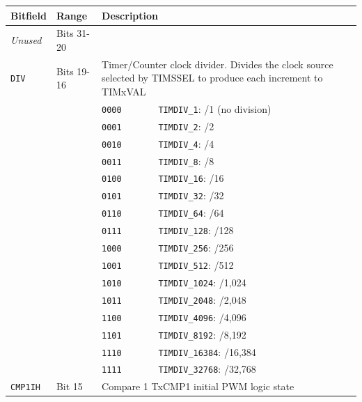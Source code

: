 \begin{tabularx}{\textwidth}{ l l l X }
\textbf{Bitfield} & \textbf{Range} & \multicolumn{2}{X}{\textbf{Description}} \\ \hline
\textit{Unused} & Bits 31-20 & \multicolumn{2}{X}{} \\
\hline
\texttt{DIV} & Bits 19-16 & \multicolumn{2}{X}{Timer/Counter clock divider. Divides the clock source selected by TIMSSEL to produce each increment to TIMxVAL} \\
 & & \texttt{0000} & \texttt{TIMDIV\_1}: /1 (no division) \\
 & & \cellcolor{tablehighlightcolor}\texttt{0001} & \cellcolor{tablehighlightcolor}\texttt{TIMDIV\_2}: /2 \\
 & & \texttt{0010} & \texttt{TIMDIV\_4}: /4 \\
 & & \cellcolor{tablehighlightcolor}\texttt{0011} & \cellcolor{tablehighlightcolor}\texttt{TIMDIV\_8}: /8 \\
 & & \texttt{0100} & \texttt{TIMDIV\_16}: /16 \\
 & & \cellcolor{tablehighlightcolor}\texttt{0101} & \cellcolor{tablehighlightcolor}\texttt{TIMDIV\_32}: /32 \\
 & & \texttt{0110} & \texttt{TIMDIV\_64}: /64 \\
 & & \cellcolor{tablehighlightcolor}\texttt{0111} & \cellcolor{tablehighlightcolor}\texttt{TIMDIV\_128}: /128 \\
 & & \texttt{1000} & \texttt{TIMDIV\_256}: /256 \\
 & & \cellcolor{tablehighlightcolor}\texttt{1001} & \cellcolor{tablehighlightcolor}\texttt{TIMDIV\_512}: /512 \\
 & & \texttt{1010} & \texttt{TIMDIV\_1024}: /1,024 \\
 & & \cellcolor{tablehighlightcolor}\texttt{1011} & \cellcolor{tablehighlightcolor}\texttt{TIMDIV\_2048}: /2,048 \\
 & & \texttt{1100} & \texttt{TIMDIV\_4096}: /4,096 \\
 & & \cellcolor{tablehighlightcolor}\texttt{1101} & \cellcolor{tablehighlightcolor}\texttt{TIMDIV\_8192}: /8,192 \\
 & & \texttt{1110} & \texttt{TIMDIV\_16384}: /16,384 \\
 & & \cellcolor{tablehighlightcolor}\texttt{1111} & \cellcolor{tablehighlightcolor}\texttt{TIMDIV\_32768}: /32,768 \\
\hline
\texttt{CMP1IH} & Bit 15 & \multicolumn{2}{X}{Compare 1 TxCMP1 initial PWM logic state} \\

\end{tabularx}
